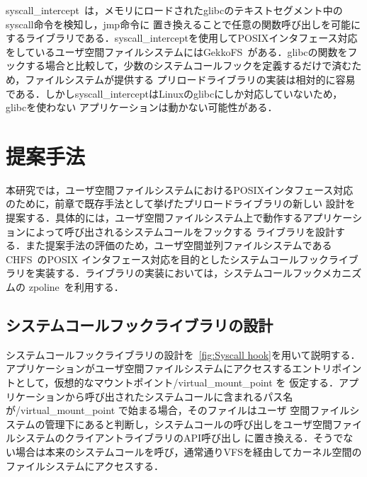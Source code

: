 \documentclass[a4paper，11pt]{jreport}
\begin{document}
syscall\_intercept~\cite{syscall-intercept}は，メモリにロードされたglibcのテキストセグメント中のsyscall命令を検知し，jmp命令に
置き換えることで任意の関数呼び出しを可能にするライブラリである．syscall\_interceptを使用してPOSIXインタフェース対応をしているユーザ空間ファイルシステムにはGekkoFS~\cite{8514892}がある．glibcの関数をフックする場合と比較して，少数のシステムコールフックを定義するだけで済むため，ファイルシステムが提供する
プリロードライブラリの実装は相対的に容易である．しかしsyscall\_interceptはLinuxのglibcにしか対応していないため，glibcを使わない
アプリケーションは動かない可能性がある．
\chapter{提案手法}
本研究では，ユーザ空間ファイルシステムにおけるPOSIXインタフェース対応のために，前章で既存手法として挙げたプリロードライブラリの新しい
設計を提案する．具体的には，ユーザ空間ファイルシステム上で動作するアプリケーションによって呼び出されるシステムコールをフックする
ライブラリを設計する．また提案手法の評価のため，ユーザ空間並列ファイルシステムであるCHFS~\cite{tatebe2022chfs}のPOSIX
インタフェース対応を目的としたシステムコールフックライブラリを実装する．ライブラリの実装においては，システムコールフックメカニズムの
zpoline~\cite{288689}を利用する．

\section{システムコールフックライブラリの設計}
システムコールフックライブラリの設計を\figurename~\ref{fig:Syscall hook}を用いて説明する．アプリケーションがユーザ空間ファイルシステムにアクセスするエントリポイントとして，仮想的なマウントポイント/virtual\_mount\_point を
仮定する．アプリケーションから呼び出されたシステムコールに含まれるパス名が/virtual\_mount\_point で始まる場合，そのファイルはユーザ
空間ファイルシステムの管理下にあると判断し，システムコールの呼び出しをユーザ空間ファイルシステムのクライアントライブラリのAPI呼び出し
に置き換える．そうでない場合は本来のシステムコールを呼び，通常通りVFSを経由してカーネル空間のファイルシステムにアクセスする．
\end{document}
